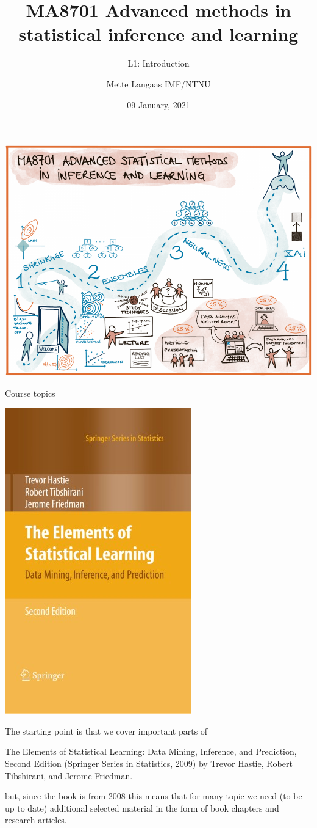 \documentclass[
  ignorenonframetext,
]{beamer}
\title{MA8701 Advanced methods in statistical inference and learning}
\subtitle{L1: Introduction}
\author{Mette Langaas IMF/NTNU}
\date{09 January, 2021}
\begin{document}
\frame{\titlepage}

\begin{frame}

\includegraphics{./overviewv1.png}

\end{frame}

\begin{frame}{Course topics}
\protect\hypertarget{course-topics}{}

\begin{flushleft}\includegraphics[width=0.2\linewidth]{ELSbookcover} \end{flushleft}

The starting point is that we cover important parts of

The Elements of Statistical Learning: Data Mining, Inference, and
Prediction, Second Edition (Springer Series in Statistics, 2009) by
Trevor Hastie, Robert Tibshirani, and Jerome Friedman.

but, since the book is from 2008 this means that for many topic we need
(to be up to date) additional selected material in the form of book
chapters and research articles.

\end{frame}
\end{document}

